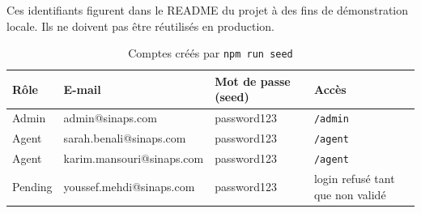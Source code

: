 Ces identifiants figurent dans le README du projet à des fins de démonstration locale. Ils ne doivent pas être réutilisés en production.

\begin{table}[H]
\centering
\caption{Comptes créés par \texttt{npm run seed}}
\label{tab:seed}
\begin{tabularx}{\textwidth}{|l|l|l|X|}
\hline
Rôle & E-mail & Mot de passe (seed) & Accès \\
\hline
Admin & admin@sinaps.com & password123 & \texttt{/admin} \\
\hline
Agent & sarah.benali@sinaps.com & password123 & \texttt{/agent} \\
\hline
Agent & karim.mansouri@sinaps.com & password123 & \texttt{/agent} \\
\hline
Pending & youssef.mehdi@sinaps.com & password123 & login refusé tant que non validé \\
\hline
\end{tabularx}
\end{table}
